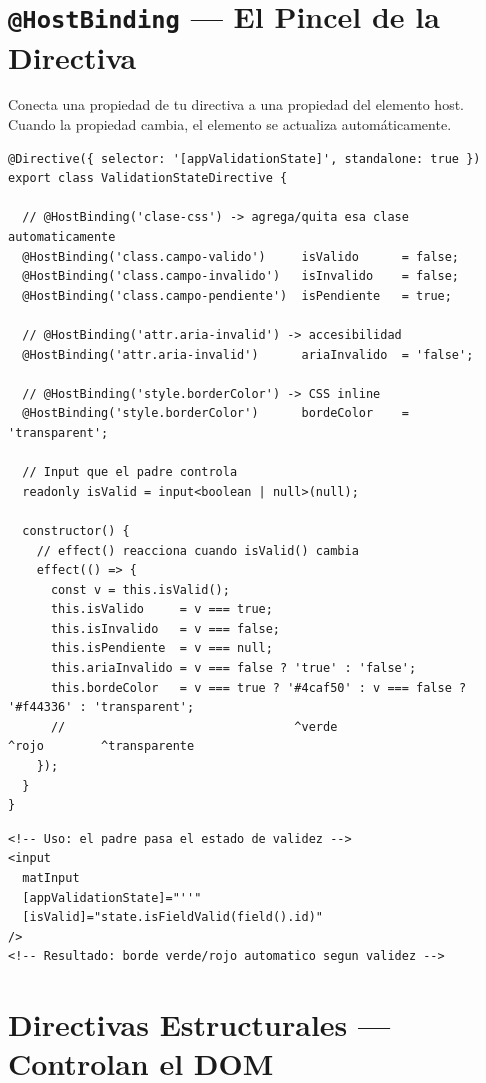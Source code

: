 \documentclass[12pt, a4paper]{article}
\begin{document}
\section{  \texttt{@HostBinding} --- El Pincel de la Directiva}

Conecta una propiedad de tu directiva a una propiedad del elemento host.
Cuando la propiedad cambia, el elemento se actualiza automáticamente.

\begin{lstlisting}
@Directive({ selector: '[appValidationState]', standalone: true })
export class ValidationStateDirective {

  // @HostBinding('clase-css') -> agrega/quita esa clase automaticamente
  @HostBinding('class.campo-valido')     isValido      = false;
  @HostBinding('class.campo-invalido')   isInvalido    = false;
  @HostBinding('class.campo-pendiente')  isPendiente   = true;

  // @HostBinding('attr.aria-invalid') -> accesibilidad
  @HostBinding('attr.aria-invalid')      ariaInvalido  = 'false';

  // @HostBinding('style.borderColor') -> CSS inline
  @HostBinding('style.borderColor')      bordeColor    = 'transparent';

  // Input que el padre controla
  readonly isValid = input<boolean | null>(null);

  constructor() {
    // effect() reacciona cuando isValid() cambia
    effect(() => {
      const v = this.isValid();
      this.isValido     = v === true;
      this.isInvalido   = v === false;
      this.isPendiente  = v === null;
      this.ariaInvalido = v === false ? 'true' : 'false';
      this.bordeColor   = v === true ? '#4caf50' : v === false ? '#f44336' : 'transparent';
      //                                ^verde                    ^rojo        ^transparente
    });
  }
}
\end{lstlisting}

\begin{lstlisting}
<!-- Uso: el padre pasa el estado de validez -->
<input
  matInput
  [appValidationState]="''"
  [isValid]="state.isFieldValid(field().id)"
/>
<!-- Resultado: borde verde/rojo automatico segun validez -->
\end{lstlisting}

\section{  Directivas Estructurales --- Controlan el DOM}
\end{document}
